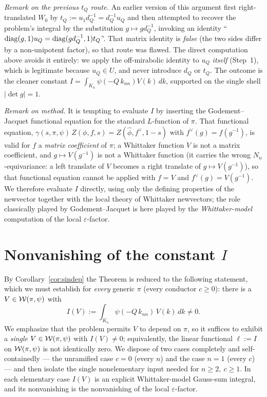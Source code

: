 \medskip
\noindent\emph{Remark on the previous $t_Q$ route.} An earlier version of this argument first
right-translated $W_0$ by $t_Q:=u_1d_Q^{-1}=d_Q^{-1}u_Q$ and then attempted to recover the
problem's integral by the substitution $g\mapsto gd_Q^{-1}$, invoking an identity
``$\operatorname{diag}(g,1)u_Q=\operatorname{diag}(gd_Q^{-1},1)t_Q$''. That matrix identity is \emph{false}
\textup{(}the two sides differ by a non-unipotent factor\textup{)}, so that route was flawed. The
direct computation above avoids it entirely: we apply the off-mirabolic identity to $u_Q$
\emph{itself} \textup{(}Step~1\textup{)}, which is legitimate because $u_Q\in U$, and never
introduce $d_Q$ or $t_Q$. The outcome is the cleaner constant
$I=\int_{K_n}\psi(-Q\,k_{nn})V(k)\,dk$, supported on the single shell $|\det g|=1$.

\medskip
\noindent\emph{Remark on method.} It is tempting to evaluate $I$ by inserting the
Godement--Jacquet functional equation for the standard $L$-function of $\pi$. That functional
equation, $\gamma(s,\pi,\psi)\,Z(\phi,f,s)=Z(\widehat\phi,f^\vee,1-s)$ with
$f^\vee(g)=f(g^{-1})$, is valid for $f$ a \emph{matrix coefficient} of $\pi$; a Whittaker
function $V$ is not a matrix coefficient, and $g\mapsto V(g^{-1})$ is not a Whittaker function
\textup{(}it carries the wrong $N_n$-equivariance: a left translate of $V$ becomes a right
translate of $g\mapsto V(g^{-1})$\textup{)}, so that functional equation cannot be applied with
$f=V$ and $f^\vee(g)=V(g^{-1})$. We therefore evaluate $I$ directly, using only the defining
properties of the newvector together with the local theory of Whittaker newvectors; the role
classically played by Godement--Jacquet is here played by the \emph{Whittaker-model} computation
of the local $\varepsilon$-factor.

\section*{Nonvanishing of the constant $I$}

By Corollary~\ref{cor:sindep} the Theorem is reduced to the following statement, which we must
establish for \emph{every} generic $\pi$ \textup{(}every conductor $c\ge0$\textup{)}: there is a
$V\in\mathcal{W}(\pi,\psi)$ with
\[
I(V):=\int_{K_n}\psi(-Q\,k_{nn})\,V(k)\,dk\neq0 .
\]
We emphasize that the problem permits $V$ to depend on $\pi$, so it suffices to exhibit a
\emph{single} $V\in\mathcal{W}(\pi,\psi)$ with $I(V)\ne0$; equivalently, the linear functional
$\ell:=I$ on $\mathcal{W}(\pi,\psi)$ is not identically zero. We dispose of two cases completely
and self-containedly --- the unramified case $c=0$ \textup{(}every $n$\textup{)} and the case
$n=1$ \textup{(}every $c$\textup{)} --- and then isolate the single nonelementary input needed
for $n\ge2,\ c\ge1$. In each elementary case $I(V)$ is an explicit Whittaker-model Gauss-sum
integral, and its nonvanishing is the nonvanishing of the local $\varepsilon$-factor.

